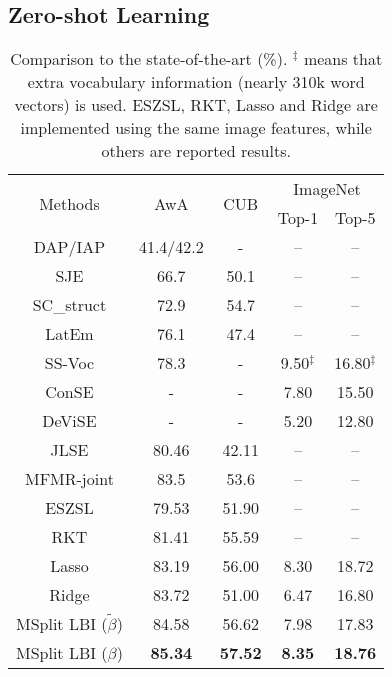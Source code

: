 \documentclass{article}
\providecommand{\tabularnewline}{\\}
\begin{document}
\subsection{Zero-shot Learning}




\noindent
\begin{table}
\small
\centering{}%
\begin{tabular}{ccccc}
\toprule
\multirow{2}{*}{{\small{}Methods} } & \multirow{2}{*}{{\small{}AwA} } & \multirow{2}{*}{{\small{}CUB} } & \multicolumn{2}{c}{{\small{}{}{}{}{}ImageNet }}\tabularnewline
\cmidrule{4-5}
 &  &  & {\small{}{}{}{}{}Top-1}  & {\small{}Top-5}\tabularnewline
\midrule
\midrule{\small{}{}{}{}{}DAP/IAP}  & {\small{}{}{}{}{}41.4/42.2} & {\small{}{}{}{}{}-}  & –  & –\tabularnewline
\midrule{\small{}{}{}{}{}SJE}  & {\small{}{}{}{}{}66.7}  & {\small{}{}{}{}{}50.1}  & –  & –\tabularnewline
\midrule{\small{}{}{}{}{}SC\_struct}  & {\small{}{}{}{}{}72.9}  & {\small{}{}{}{}{}54.7}  & –  & –\tabularnewline
\midrule{\small{}{}{}{}{}LatEm}  & {\small{}{}{}{}{}76.1}  & {\small{}{}{}{}{}47.4}  & –  & –\tabularnewline
\midrule{\small{}{}{}{}{}SS-Voc}  & {\small{}{}{}{}{}78.3}  & {\small{}{}{}{}{}-}  & {\small{}{}{}{}{}{9.50}$^{\ddagger}$}  & {\small{}16.80$^{\ddagger}$ }\tabularnewline
\midrule{\small{}{}{}{}{}ConSE}  & {\small{}{}{}{}{}-}  & {\small{}{}{}{}{}-}  & {\small{}{}{}{}{}7.80}  & {\small{}15.50 }\tabularnewline
\midrule{\small{}{}{}{}{}DeViSE}  & {\small{}{}{}{}{}-}  & {\small{}{}{}{}{}-}  & {\small{}{}{}{}{}5.20}  & {\small{}12.80 }\tabularnewline
\midrule{\small{}{}{}{}{}JLSE}  & {\small{}{}{}{}{}80.46}  & {\small{}{}{}{}{}42.11}  & –  & –\tabularnewline
\midrule{\small{}{}{}{}{}MFMR-joint}  & {\small{}{}{}{}{}83.5}  & {\small{}{}{}{}{}53.6}  & –  & –\tabularnewline
\midrule
\midrule{\small{}{}{}{}{}ESZSL}  & {\small{}{}{}{}{}79.53}  & {\small{}{}{}{}{}51.90}  & –  & –\tabularnewline
\midrule{\small{}{}{}{}{}RKT}  & {\small{}{}{}{}{}81.41}  & {\small{}{}{}{}{}55.59}  & –  & –\tabularnewline
\midrule{\small{}{}{}{}{} Lasso}  & {\small{}{}{}{}{} 83.19}  & {\small{}{}{}{}{} 56.00}  & {\small{}{}{}{}{}8.30}  & {\small{}{}{}{}{}18.72 }\tabularnewline
\midrule{\small{}{}{}{}{} Ridge}  & {\small{}{}{}{}{} 83.72}  & {\small{}{}{}{}{} 51.00}  & {\small{}{}{}{}{} 6.47}  & {\small{}{}{}{}{} 16.80 }\tabularnewline
\midrule{\small{}{}{}{}{}MSplit LBI ($\tilde{\beta}$)}  & {\small{}{}{}{}{}{84.58}}  & {\small{}{}{}{}{}{56.62}}  & {\small{}{}{}{}{}7.98}  & {\small{}17.83 }\tabularnewline
\midrule{\small{}{}{}{}{}MSplit LBI ($\beta$)}  & \textbf{\small{}{}{}{}{}85.34}{\small{}{}{}{}{}}  & \textbf{\small{}{}{}{}{}57.52}{\small{}{}{}{}{}}  & \textbf{\small{}{}{}{}{}8.35}{\small{}{}{}{}{}}  & \textbf{\small{}18.76}{\small{} }\tabularnewline
\bottomrule
\end{tabular}{\small{}\caption{{\small{}Comparison to the state-of-the-art (\%).  $^{\ddagger}$
means that extra vocabulary information (nearly 310k word vectors)
is used. ESZSL, RKT, Lasso and Ridge are implemented using the same image features, while others are reported results.} }
{\small{}\vspace{-0.1in}}\label{tab:comparison}}
\end{table}
\end{document}
